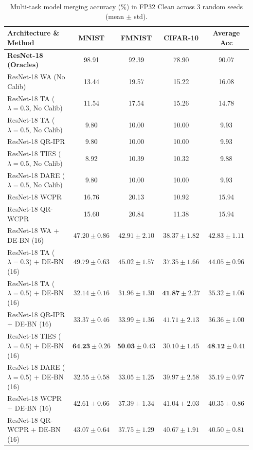 \documentclass{article}
\theoremstyle{plain}
\theoremstyle{definition}
\theoremstyle{remark}
\begin{document}
\begin{table}[t]
\caption{Multi-task model merging accuracy (\%) in FP32 Clean across 3 random seeds (mean $\pm$ std).}
\label{tab:fp32_clean}
\begin{center}
\begin{tabular}{lcccc}
\toprule
\textbf{Architecture \& Method} & \textbf{MNIST} & \textbf{FMNIST} & \textbf{CIFAR-10} & \textbf{Average Acc} \\
\midrule
\textbf{ResNet-18 (Oracles)} & 98.91 & 92.39 & 78.90 & 90.07 \\
\midrule
ResNet-18 WA (No Calib) & 13.44 & 19.57 & 15.22 & 16.08 \\
ResNet-18 TA ($\lambda=0.3$, No Calib) & 11.54 & 17.54 & 15.26 & 14.78 \\
ResNet-18 TA ($\lambda=0.5$, No Calib) & 9.80 & 10.00 & 10.00 & 9.93 \\
ResNet-18 QR-IPR & 9.80 & 10.00 & 10.00 & 9.93 \\
ResNet-18 TIES ($\lambda=0.5$, No Calib) & 8.92 & 10.39 & 10.32 & 9.88 \\
ResNet-18 DARE ($\lambda=0.5$, No Calib) & 9.80 & 10.00 & 10.00 & 9.93 \\
ResNet-18 WCPR & 16.76 & 20.13 & 10.92 & 15.94 \\
ResNet-18 QR-WCPR & 15.60 & 20.84 & 11.38 & 15.94 \\
\midrule
ResNet-18 WA + DE-BN (16) & $47.20 \pm 0.86$ & $42.91 \pm 2.10$ & $38.37 \pm 1.82$ & $42.83 \pm 1.11$ \\
ResNet-18 TA ($\lambda=0.3$) + DE-BN (16) & $49.79 \pm 0.63$ & $45.02 \pm 1.57$ & $37.35 \pm 1.66$ & $44.05 \pm 0.96$ \\
ResNet-18 TA ($\lambda=0.5$) + DE-BN (16) & $32.14 \pm 0.16$ & $31.96 \pm 1.30$ & $\textbf{41.87} \pm 2.27$ & $35.32 \pm 1.06$ \\
ResNet-18 QR-IPR + DE-BN (16) & $33.37 \pm 0.46$ & $33.99 \pm 1.36$ & $41.71 \pm 2.13$ & $36.36 \pm 1.00$ \\
ResNet-18 TIES ($\lambda=0.5$) + DE-BN (16) & $\textbf{64.23} \pm 0.26$ & $\textbf{50.03} \pm 0.43$ & $30.10 \pm 1.45$ & $\textbf{48.12} \pm 0.41$ \\
ResNet-18 DARE ($\lambda=0.5$) + DE-BN (16) & $32.55 \pm 0.58$ & $33.05 \pm 1.25$ & $39.97 \pm 2.58$ & $35.19 \pm 0.97$ \\
ResNet-18 WCPR + DE-BN (16) & $42.61 \pm 0.66$ & $37.39 \pm 1.34$ & $41.04 \pm 2.03$ & $40.35 \pm 0.86$ \\
ResNet-18 QR-WCPR + DE-BN (16) & $43.07 \pm 0.64$ & $37.75 \pm 1.29$ & $40.67 \pm 1.91$ & $40.50 \pm 0.81$ \\

\end{tabular}
\end{center}
\end{table}
\end{document}
